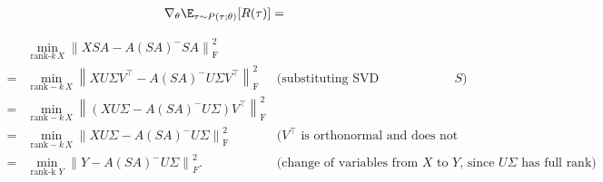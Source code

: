 \begin{align*}
\nabla_\theta \E_{\tau \sim P(\tau; \theta)} [R(\tau)]
& = 
\end{align*}

\begin{align}
      & \min _{\text {rank-}k\, X}\left\|X S A-A(S A)^{-} S
    A\right\|_{\mathrm{F}}^{2}                                                                                                                               \\
    = & \min _{\text {rank}-k\, X}\left\|X U \Sigma
    V^{\top}-A(S A)^{-} U \Sigma V^{\top}\right\|_{\mathrm{F}}^{2}
      & \text{(substituting SVD representation of $S$)}                                                                                                      \\
    = & \min _{\text
        {rank}-k\, X}\left\|\left(X U \Sigma-A(S A)^{-} U \Sigma\right)
    V^{\top}\right\|_{\mathrm{F}}^{2}                                                                                                                        \\
    = & \min _{\text
        {rank}-k\, X}\left\|X U \Sigma-A(S A)^{-} U \Sigma
    \right\|_{\mathrm{F}}^{2}
      & \text{($V^\top$ is orthonormal and does not change norm)}                                                                                            \\
    = & \min _{\text {rank-k } Y}\left\|Y - A (SA)^- U \Sigma\right\|_{F}^{2}. & \text{(change of variables from $X$ to $Y$, since $U\Sigma$ has full rank)} \\
\end{align}
